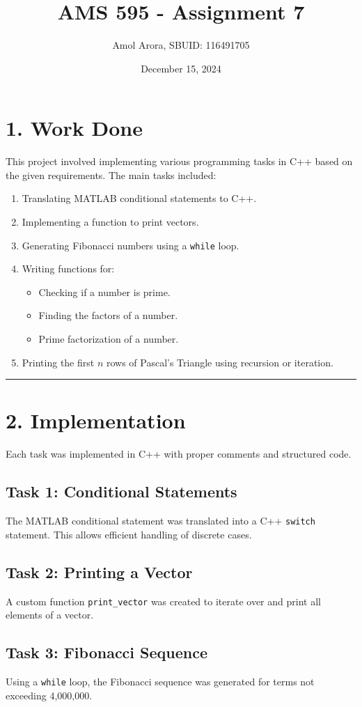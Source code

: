 \documentclass[12pt]{article}
\title{AMS 595 - Assignment 7}
\author{Amol Arora, SBUID: 116491705}
\date{December 15, 2024}
\begin{document}
\maketitle

\section*{1. Work Done}
This project involved implementing various programming tasks in C++ based on the given requirements. The main tasks included:

\begin{enumerate}
    \item Translating MATLAB conditional statements to C++.
    \item Implementing a function to print vectors.
    \item Generating Fibonacci numbers using a \texttt{while} loop.
    \item Writing functions for:
    \begin{itemize}
        \item Checking if a number is prime.
        \item Finding the factors of a number.
        \item Prime factorization of a number.
    \end{itemize}
    \item Printing the first \(n\) rows of Pascal's Triangle using recursion or iteration.
\end{enumerate}
\hrule
\section*{2. Implementation}
Each task was implemented in C++ with proper comments and structured code.

\subsection*{Task 1: Conditional Statements}
The MATLAB conditional statement was translated into a C++ \texttt{switch} statement. This allows efficient handling of discrete cases.

\subsection*{Task 2: Printing a Vector}
A custom function \texttt{print\_vector} was created to iterate over and print all elements of a vector.

\subsection*{Task 3: Fibonacci Sequence}
Using a \texttt{while} loop, the Fibonacci sequence was generated for terms not exceeding 4,000,000.
\end{document}
